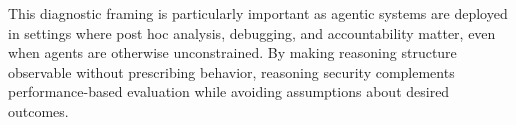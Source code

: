 This diagnostic framing is particularly important as agentic systems are deployed in settings where post hoc analysis, debugging, and accountability matter, even when agents are otherwise unconstrained. By making reasoning structure observable without prescribing behavior, reasoning security complements performance-based evaluation while avoiding assumptions about desired outcomes.
